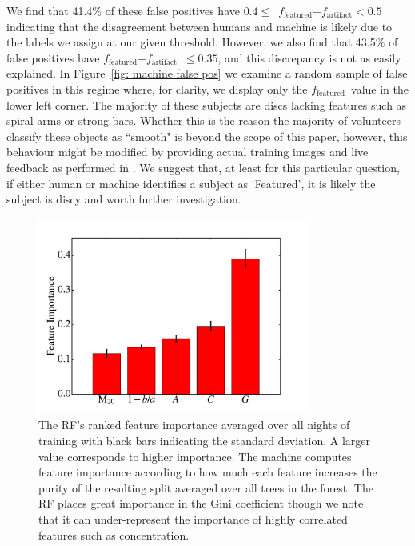 \documentclass[twocolumn,  trackchanges, ]{aastex6}%
\newcommand{\feat}{`Featured'}
\newcommand{\ffeat}{$f_{\mathrm{featured}}$}
\newcommand{\fstar}{$f_{\mathrm{artifact}}$}
\begin{document}
We find that 41.4\% of these false positives have $0.4 \le$~\ffeat+\fstar$<0.5$ 
indicating that the disagreement between humans and machine is likely due to the 
labels we assign at our given threshold. However, we also find that 43.5\% of false 
positives have \ffeat+\fstar~$\le0.35$, and this discrepancy is not as easily explained. 
 In Figure~\ref{fig: machine false pos} we examine a random sample of false positives 
in this regime where, for clarity, we display only the \ffeat~value in the lower left corner. 
The majority of these subjects are discs lacking features such as spiral arms or strong bars. 
Whether this is the reason the majority of volunteers classify these objects as 
``smooth" is beyond the scope of this paper, however, this behaviour might be 
modified by providing actual training images and live feedback as performed in
 \cite{Marshall2016}. We suggest that, at least for this particular question, 
if either human or machine identifies a subject as \feat, it is likely the subject 
is discy and worth further investigation.


\begin{figure}[t]
\includegraphics[width=3.5in]{f14.pdf}
\caption{The RF's ranked feature importance averaged over all nights of training with black bars indicating the standard deviation. A larger value corresponds to higher importance. The machine computes feature importance according to how much each feature increases the purity of the resulting split averaged over all trees in the forest. The RF places great importance in the Gini coefficient though we note that it can under-represent the importance of highly correlated features such as concentration.\label{fig: feature importance}}
\end{figure}
\end{document}
